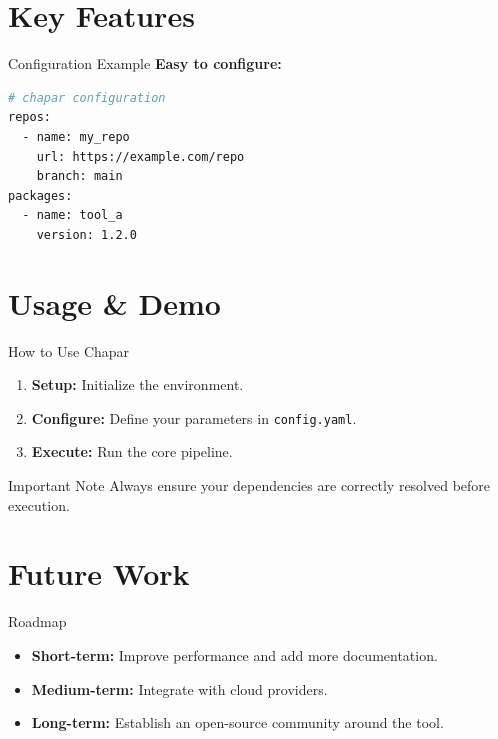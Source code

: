 \documentclass[aspectratio=169]{beamer}
\begin{document}
\section{Key Features}

\begin{frame}[fragile]{Configuration Example} %
    \textbf{Easy to configure:}
    \vspace{0.3cm}
    \begin{lstlisting}[language=bash, caption={Example configuration snippet}]
# chapar configuration
repos:
  - name: my_repo
    url: https://example.com/repo
    branch: main
packages:
  - name: tool_a
    version: 1.2.0
    \end{lstlisting}
\end{frame}

\section{Usage \& Demo}

\begin{frame}{How to Use Chapar}
    \begin{enumerate}
        \item \textbf{Setup:} Initialize the environment.
        \item \textbf{Configure:} Define your parameters in \texttt{config.yaml}.
        \item \textbf{Execute:} Run the core pipeline.
    \end{enumerate}
    
    \vspace{0.5cm}
    \begin{alertblock}{Important Note}
        Always ensure your dependencies are correctly resolved before execution.
    \end{alertblock}
\end{frame}

\section{Future Work}

\begin{frame}{Roadmap}
    \begin{itemize}
        \item \textbf{Short-term:} Improve performance and add more documentation.
        \item \textbf{Medium-term:} Integrate with cloud providers.
        \item \textbf{Long-term:} Establish an open-source community around the tool.
    \end{itemize}
\end{frame}
\end{document}
